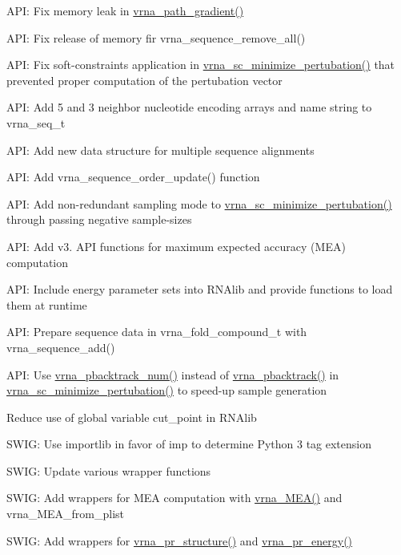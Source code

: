 \begin{DoxyItemize}
\item A\+PI\+: Fix memory leak in {\ttfamily \mbox{\hyperlink{group__paths__walk_ga9594d7424dbe301f0dd3f4900db0f05c}{vrna\+\_\+path\+\_\+gradient()}}}
\item A\+PI\+: Fix release of memory fir {\ttfamily vrna\+\_\+sequence\+\_\+remove\+\_\+all()}
\item A\+PI\+: Fix soft-\/constraints application in {\ttfamily \mbox{\hyperlink{group__perturbation_gaa124bdc20d88001c38ade590c4bcc3c4}{vrna\+\_\+sc\+\_\+minimize\+\_\+pertubation()}}} that prevented proper computation of the pertubation vector
\item A\+PI\+: Add 5\textquotesingle{} and 3\textquotesingle{} neighbor nucleotide encoding arrays and name string to {\ttfamily vrna\+\_\+seq\+\_\+t}
\item A\+PI\+: Add new data structure for multiple sequence alignments
\item A\+PI\+: Add {\ttfamily vrna\+\_\+sequence\+\_\+order\+\_\+update()} function
\item A\+PI\+: Add non-\/redundant sampling mode to {\ttfamily \mbox{\hyperlink{group__perturbation_gaa124bdc20d88001c38ade590c4bcc3c4}{vrna\+\_\+sc\+\_\+minimize\+\_\+pertubation()}}} through passing negative sample-\/sizes
\item A\+PI\+: Add v3. A\+PI functions for maximum expected accuracy (M\+EA) computation
\item A\+PI\+: Include energy parameter sets into {\ttfamily R\+N\+Alib} and provide functions to load them at runtime
\item A\+PI\+: Prepare sequence data in {\ttfamily vrna\+\_\+fold\+\_\+compound\+\_\+t} with {\ttfamily vrna\+\_\+sequence\+\_\+add()}
\item A\+PI\+: Use {\ttfamily \mbox{\hyperlink{group__subopt__stochbt_ga596ed9bcd86f629a7c7c59c58b297db5}{vrna\+\_\+pbacktrack\+\_\+num()}}} instead of {\ttfamily \mbox{\hyperlink{group__subopt__stochbt_ga594844ac73c4e66e00d6791b31540634}{vrna\+\_\+pbacktrack()}}} in {\ttfamily \mbox{\hyperlink{group__perturbation_gaa124bdc20d88001c38ade590c4bcc3c4}{vrna\+\_\+sc\+\_\+minimize\+\_\+pertubation()}}} to speed-\/up sample generation
\item Reduce use of global variable {\ttfamily cut\+\_\+point} in {\ttfamily R\+N\+Alib}
\item S\+W\+IG\+: Use {\ttfamily importlib} in favor of {\ttfamily imp} to determine Python 3 tag extension
\item S\+W\+IG\+: Update various wrapper functions
\item S\+W\+IG\+: Add wrappers for M\+EA computation with {\ttfamily \mbox{\hyperlink{group__mea__fold_ga9b87b664ef014c1266aa50d5bc39f2ac}{vrna\+\_\+\+M\+E\+A()}}} and {\ttfamily vrna\+\_\+\+M\+E\+A\+\_\+from\+\_\+plist}
\item S\+W\+IG\+: Add wrappers for {\ttfamily \mbox{\hyperlink{group__part__func__global_ga882c35d9dd775c1275593b3b6a966bec}{vrna\+\_\+pr\+\_\+structure()}}} and {\ttfamily \mbox{\hyperlink{equilibrium__probs_8h_aa88e17336daede0e6db4da1f3252c031}{vrna\+\_\+pr\+\_\+energy()}}}
\end{DoxyItemize}

